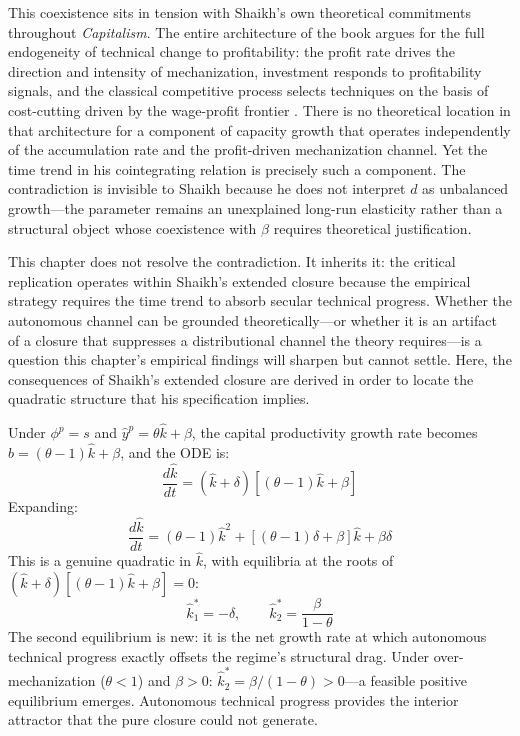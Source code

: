 This coexistence sits in tension with Shaikh's own theoretical commitments throughout \emph{Capitalism}. The entire architecture of the book argues for the full endogeneity of technical change to profitability: the profit rate drives the direction and intensity of mechanization, investment responds to profitability signals, and the classical competitive process selects techniques on the basis of cost-cutting driven by the wage-profit frontier \citep{Shaikh2016}. There is no theoretical location in that architecture for a component of capacity growth that operates independently of the accumulation rate and the profit-driven mechanization channel. Yet the time trend in his cointegrating relation is precisely such a component. The contradiction is invisible to Shaikh because he does not interpret $d$ as unbalanced growth---the parameter remains an unexplained long-run elasticity rather than a structural object whose coexistence with $\beta$ requires theoretical justification.

This chapter does not resolve the contradiction. It inherits it: the critical replication operates within Shaikh's extended closure because the empirical strategy requires the time trend to absorb secular technical progress. Whether the autonomous channel can be grounded theoretically---or whether it is an artifact of a closure that suppresses a distributional channel the theory requires---is a question this chapter's empirical findings will sharpen but cannot settle. Here, the consequences of Shaikh's extended closure are derived in order to locate the quadratic structure that his specification implies.

Under $\phi^p = s$ and $\hat{y}^p = \theta\hat{k} + \beta$, the capital productivity growth rate becomes $\hat{b} = (\theta - 1)\hat{k} + \beta$, and the ODE is:
%
\begin{equation}\label{eq:extended_ode}
	\frac{d\hat{k}}{dt} = (\hat{k} + \delta)\left[(\theta - 1)\hat{k} + \beta\right]
\end{equation}
%
Expanding:
%
\begin{equation}\label{eq:quadratic_expanded}
	\frac{d\hat{k}}{dt} = (\theta - 1)\hat{k}^2 + \left[(\theta - 1)\delta + \beta\right]\hat{k} + \beta\delta
\end{equation}
%
This is a genuine quadratic in $\hat{k}$, with equilibria at the roots of $(\hat{k} + \delta)[(\theta - 1)\hat{k} + \beta] = 0$:
%
\begin{equation}\label{eq:extended_equilibria}
	\hat{k}_1^* = -\delta, \qquad \hat{k}_2^* = \frac{\beta}{1 - \theta}
\end{equation}
%
The second equilibrium is new: it is the net growth rate at which autonomous technical progress exactly offsets the regime's structural drag. Under over-mechanization ($\theta < 1$) and $\beta > 0$: $\hat{k}_2^* = \beta/(1 - \theta) > 0$---a feasible positive equilibrium emerges. Autonomous technical progress provides the interior attractor that the pure closure could not generate.

